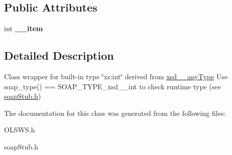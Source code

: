 \subsection*{Public Attributes}
\begin{DoxyCompactItemize}
\item 
\hypertarget{classxsd____int_ac31ef07f2dde56743a4623f41a45292e}{
int {\bfseries \_\-\_\-item}}
\label{classxsd____int_ac31ef07f2dde56743a4623f41a45292e}

\end{DoxyCompactItemize}


\subsection{Detailed Description}
Class wrapper for built-\/in type \char`\"{}xs:int\char`\"{} derived from \hyperlink{classxsd____anyType}{xsd\_\-\_\-anyType} Use soap\_\-type() == SOAP\_\-TYPE\_\-xsd\_\-\_\-int to check runtime type (see \hyperlink{soapStub_8h_source}{soapStub.h}) 

The documentation for this class was generated from the following files:\begin{DoxyCompactItemize}
\item 
OLSWS.h\item 
soapStub.h\end{DoxyCompactItemize}
